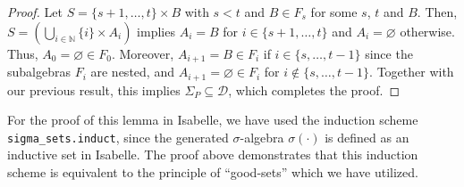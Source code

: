 \begin{proof}
	Let $S = \{s + 1,\dots,t\} \times B$ with $s < t$ and $B \in F_s$ for some $s$, $t$ and $B$. Then, $S = (\bigcup_{i \in \mathbb{N}} \{i\} \times A_i)$ implies $A_i = B$ for $i \in \{s + 1,\dots,t\}$ and $A_i = \varnothing$ otherwise. Thus, $A_0 = \varnothing \in F_0$. Moreover, $A_{i + 1} = B \in F_i$ if $i \in \{s,\dots,t - 1\}$ since the subalgebras $F_i$ are nested, and $A_{i + 1} = \varnothing \in F_i$ for $i \notin \{s,\dots,t - 1\}$. Together with our previous result, this implies $\Sigma_P \subseteq \mathcal{D}$, which completes the proof.
\end{proof}

\begin{remark}
	For the proof of this lemma in Isabelle, we have used the induction scheme \texttt{sigma\_sets.induct}, since the generated $\sigma$-algebra $\sigma(\cdot)$ is defined as an inductive set in Isabelle. The proof above demonstrates that this induction scheme is equivalent to the principle of ``good-sets'' which we have utilized.
\end{remark}

